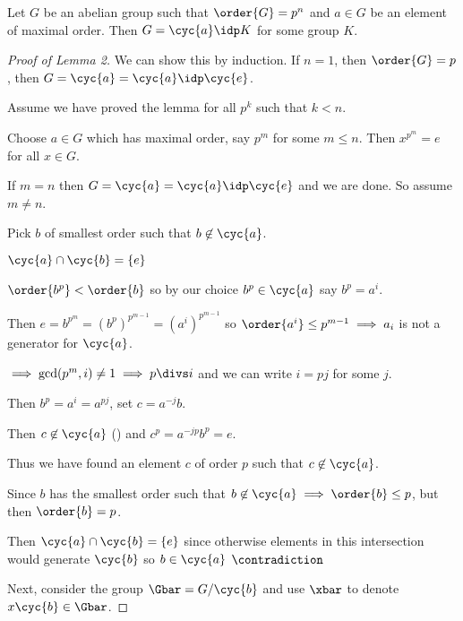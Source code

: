  \begin{lemma}
    Let \(G\) be an abelian group such that \(\order{G}=p^n\) and \(a\in G\) be an element of maximal order. Then \(G = \cyc{a}\idp K\) for some group \(K\).
 \end{lemma}

 \begin{proof}[Proof of Lemma 2]
     We can show this by induction.  If \(n = 1\), then \(\order{G} = p\), then \(G = \cyc{a}=\cyc{a}\idp\cyc{e}\).

     Assume we have proved the lemma for all \(p^k\) such that \(k < n\).

     Choose \(a\in G\) which has maximal order, say \(p^m\) for some \(m\leq n\).  Then \(x^{p^m} = e\) for all \(x\in G\).

     If \(m = n\) then \(G = \cyc{a}=\cyc{a}\idp\cyc{e}\) and we are done.  So assume \(m \neq n\).

     Pick \(b\) of smallest order such that \(b\not\in\cyc{a}\).

     \begin{claim}
     $\cyc{a}\cap \cyc{b} = \{e\}$
     \end{claim}
     \begin{subproof}
         \vspace*{-1em}\(\order{b^p} < \order{b}\) so by our choice \(b^p\in \cyc{a}\) say \(b^p=a^i\).

         Then \(e = b^{p^m} = (b^{p})^{p^{m-1}} = (a^i)^{p^{m-1}}\) so \(\order{a^i}\leq p^{m-1} \implies a_i\) is not a generator for \(\cyc{a}\).

         \(\implies \gcd(p^m, i) \neq 1 \implies p\divs i\) and we can write \(i = pj\) for some \(j\).

         Then \(b^p = a^i = a^{pj}\), set \(c=a^{-j}b\).

         Then \(c\not\in\cyc{a}\) () and \(c^p = a^{-jp}b^p = e\).

         Thus we have found an element \(c\) of order \(p\) such that \(c\not\in\cyc{a}\).

         Since \(b\) has the smallest order such that \(b\not\in\cyc{a}\implies \order{b}\leq p\), but then \(\order{b}=p\).

         Then \(\cyc{a}\cap\cyc{b}=\{e\}\) since otherwise elements in this intersection would generate \(\cyc{b}\) so \(b\in\cyc{a}\) \(\contradiction\)
     \end{subproof}
     Next, consider the group \(\Gbar = G / \cyc{b}\) and use \(\xbar\) to denote \(x\cyc{b}\in\Gbar\).


\end{proof}

